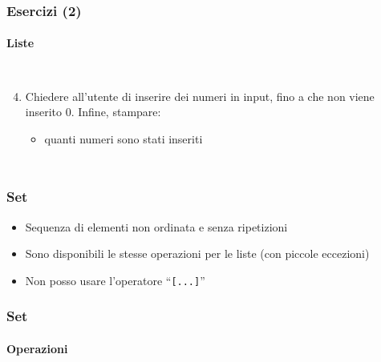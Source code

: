 \begin{exerciseframe}
    \frametitle{Esercizi (2)}
    \framesubtitle{Liste}

    \begin{columns}
        \begin{enumerate}
            \setcounter{enumi}{3}
            \item Chiedere all'utente di inserire dei numeri in input, fino a che non viene inserito 0. Infine, stampare:
            \begin{itemize}
                \item quanti numeri sono stati inseriti
            \end{itemize}
        \end{enumerate}
        
        \centering
    \end{columns}
    
\end{exerciseframe}

\begin{contentframe}
    \frametitle{Set}

    \begin{itemize}
        \item Sequenza di elementi non ordinata e senza ripetizioni

        \bigskip
        \item Sono disponibili le stesse operazioni per le liste (con piccole eccezioni)
        \item Non posso usare l'operatore ``\texttt{[...]}''
    \end{itemize}
\end{contentframe}

\begin{contentframe}
    \frametitle{Set}
    \framesubtitle{Operazioni}

 \end{contentframe}

